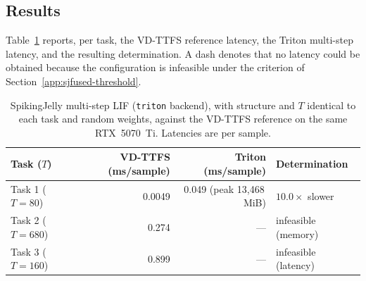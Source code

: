 \documentclass[runningheads]{llncs}
\begin{document}
\subsection{Results}\label{app:sjfused-results}
Table~\ref{tab:sjfused} reports, per task, the VD-TTFS reference latency, the
Triton multi-step latency, and the resulting determination. A dash denotes that
no latency could be obtained because the configuration is infeasible under the
criterion of Section~\ref{app:sjfused-threshold}.

\begin{table}[t]
\centering
\caption{SpikingJelly multi-step LIF (\texttt{triton} backend), with structure and
$T$ identical to each task and random weights, against the VD-TTFS reference on the
same RTX~5070~Ti. Latencies are per sample.}
\label{tab:sjfused}
\begin{tabular}{lrrl}
\toprule
Task ($T$) & VD-TTFS (ms/sample) & Triton (ms/sample) & Determination \\
\midrule
Task 1 ($T{=}80$)  & 0.0049 & 0.049 (peak 13{,}468\,MiB) & $10.0\times$ slower \\
Task 2 ($T{=}680$) & 0.274  & ---   & infeasible (memory) \\
Task 3 ($T{=}160$) & 0.899  & ---   & infeasible (latency) \\
\bottomrule
\end{tabular}
\end{table}
\end{document}
